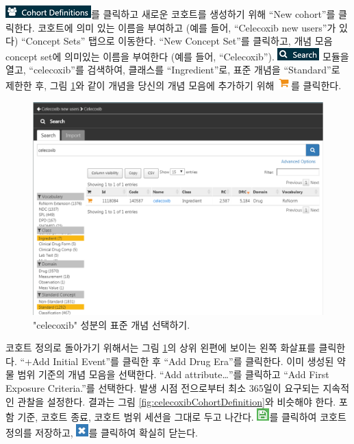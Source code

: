 \documentclass[10.5pt]{book}
\theoremstyle{definition}
\theoremstyle{definition}
\theoremstyle{definition}
\theoremstyle{remark}
\begin{document}
\includegraphics{images/Cohorts/cohortdefinition.png}를 클릭하고 새로운
코호트를 생성하기 위해 ``New cohort''를 클릭한다. 코호트에 의미 있는
이름을 부여하고 (예를 들어, ``Celecoxib new users''가 있다) ``Concept
Sets'' 탭으로 이동한다. ``New Concept Set''를 클릭하고, 개념 모음
concept set에 의미있는 이름을 부여한다 (예를 들어, ``Celecoxib'').
\includegraphics{images/Cohorts/search-2.png} 모듈을 열고,
``celecoxib''를 검색하여, 클래스를 ``Ingredient''로, 표준 개념을
``Standard''로 제한한 후, 그림 \ref{fig:conceptSearchAtlas}와 같이
개념을 당신의 개념 모음에 추가하기 위해
\includegraphics{images/Cohorts/shoppingcart.png}를 클릭한다.

\begin{figure}

{\centering \includegraphics[width=1\linewidth]{images/SuggestedAnswers/conceptSearchAtlas} 

}

\caption{"celecoxib" 성분의 표준 개념 선택하기.}\label{fig:conceptSearchAtlas}
\end{figure}

코호트 정의로 돌아가기 위해서는 그림 \ref{fig:conceptSearchAtlas}의 상위
왼편에 보이는 왼쪽 화살표를 클릭한다. ``+Add Initial Event''를 클릭한 후
``Add Drug Era''를 클릭한다. 이미 생성된 약물 범위 기준의 개념 모음을
선택한다. ``Add attribute\ldots{}''를 클릭하고 ``Add First Exposure
Criteria.''를 선택한다. 발생 시점 전으로부터 최소 365일이 요구되는
지속적인 관찰을 설정한다. 결과는 그림
\ref{fig:celecoxibCohortDefinition}와 비슷해야 한다. 포함 기준, 코호트
종료, 코호트 범위 세션을 그대로 두고 나간다.
\includegraphics{images/Cohorts/save.png}를 클릭하여 코호트 정의를
저장하고, \includegraphics{images/SuggestedAnswers/close.png}를 클릭하여
확실히 닫는다.
\end{document}
